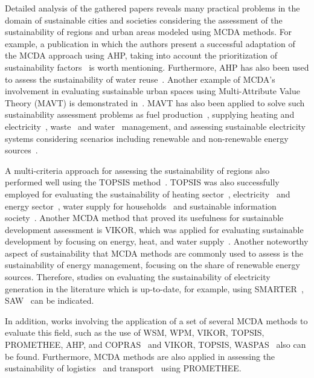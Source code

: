 \documentclass[final,5p,times,twocolumn,authoryear]{elsarticle}
\newcounter{example}[section]
\begin{document}
Detailed analysis of the gathered papers reveals many practical problems in the domain of sustainable cities and societies considering the assessment of the sustainability of regions and urban areas modeled using MCDA methods. 
For example, a publication in which the authors present a successful adaptation of the MCDA approach using AHP, taking into account the prioritization of sustainability factors~\citep{fernandes2018assessing} is worth mentioning. Furthermore, AHP has also been used to assess the sustainability of water reuse~\citep{opher2019comparative}. Another example of MCDA's involvement in evaluating sustainable urban spaces using Multi-Attribute Value Theory (MAVT) is demonstrated in~\citep{oppio2018assessing}. MAVT has also been applied to solve such sustainability assessment problems as fuel production~\citep{ekener2018developing}, supplying heating and electricity~\citep{gwerder2019life}, waste~\citep{deshpande2020multi} and water~\citep{zhao2021quantifying} management, and assessing sustainable electricity systems considering scenarios including renewable and non-renewable energy sources~\citep{roinioti2019integrated, atilgan2017energy}.

A multi-criteria approach for assessing the sustainability of regions also performed well using the TOPSIS method~\citep{boggia2018spatial}. TOPSIS was also successfully employed for evaluating the sustainability of heating sector~\citep{siksnelyte2021multi}, electricity~\citep{sahabuddin2021multi} and energy sector~\citep{su2020sustainability}, water supply for households~\citep{boggia2018spatial} and sustainable information society~\citep{wkatrobski2018index}. Another MCDA method that proved its usefulness for sustainable development assessment is VIKOR, which was applied for evaluating sustainable development by focusing on energy, heat, and water supply~\citep{aberilla2020integrated}. Another noteworthy aspect of sustainability that MCDA methods are commonly used to assess is the sustainability of energy management, focusing on the share of renewable energy sources. Therefore, studies on evaluating the sustainability of electricity generation in the literature which is up-to-date, for example, using SMARTER~\citep{khan2019power, khan2020sustainability}, SAW~\citep{naegler2021integrated, shaaban2018sustainability} can be indicated.

In addition, works involving the application of a set of several MCDA methods to evaluate this field, such as the use of WSM, WPM, VIKOR, TOPSIS, PROMETHEE, AHP, and COPRAS~\citep{sahabuddin2021multi} and VIKOR, TOPSIS, WASPAS~\citep{su2020sustainability} also can be found. Furthermore, MCDA methods are also applied in assessing the sustainability of logistics~\citep{melkonyan2020sustainability} and transport~\citep{morfoulaki2021use} using PROMETHEE.
\end{document}
